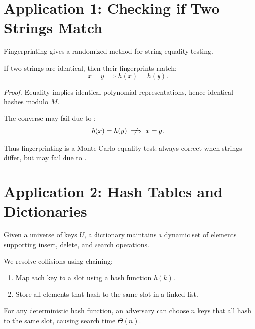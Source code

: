 \documentclass[11pt]{exam}
\begin{document}
\newpage

\section{Application 1: Checking if Two Strings Match}

Fingerprinting gives a randomized method for string equality testing.

\begin{theorem}
If two strings are identical, then their fingerprints match:
\[
x = y \implies h(x) = h(y).
\]
\end{theorem}

\textit{Proof.}
Equality implies identical polynomial representations, hence identical hashes modulo $M$.

\vspace{0.5em}

The converse may fail due to :
\[
h(x) = h(y) \centernot\implies x = y.
\]

Thus fingerprinting is a Monte Carlo equality test: always correct when strings differ, but may fail due to .
	
\section{Application 2: Hash Tables and Dictionaries}

Given a universe of keys $U$, a dictionary maintains a dynamic set of elements supporting insert, delete, and search operations.

\vspace{0.5em}

We resolve collisions using chaining:
\begin{enumerate}
    \item Map each key to a slot using a hash function $h(k)$.
    \item Store all elements that hash to the same slot in a linked list.
\end{enumerate}

\newpage

\begin{theorem}
For any deterministic hash function, an adversary can choose $n$ keys that all hash to the same slot, causing search time $\Theta(n)$.
\end{theorem}
\end{document}
